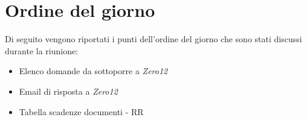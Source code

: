 \clearpage
\section{Ordine del giorno}
Di seguito vengono riportati i punti dell’ordine del giorno che sono stati discussi durante la riunione:
\begin{itemize}
	\item Elenco domande da sottoporre a \emph{Zero12}
	\item Email di risposta a \emph{Zero12}
	\item Tabella scadenze documenti - RR
\end{itemize}